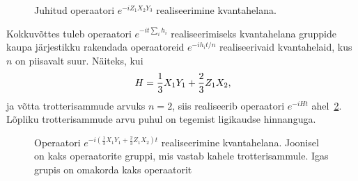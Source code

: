 \documentclass[12pt]{report}
\def\paren#1{\left(#1\right)}
\begin{document}
\begin{figure}[h]
  \centering
  \ifdefined\yquanton
  \fi
  \caption{Juhitud operaatori \(e^{-iZ_1X_2Y_3}\) realiseerimine kvantahelana.}
  \label{f:xyzex}
\end{figure}

Kokkuvõttes tuleb operaatori \(e^{-i t \sum_i h_i}\) realiseerimiseks kvantahelana gruppide kaupa järjestikku rakendada operaatoreid \(e^{-i h_i t/n}\) realiseerivaid kvantahelaid, kus \(n\) on piisavalt suur.
Näiteks, kui
\begin{align}\label{eq:hex}
    H=\frac{1}{3}X_1Y_1+\frac{2}{3}Z_1X_2 \rlap{,}
\end{align}
ja võtta trotterisammude arvuks \(n = 2\), siis realiseerib operaatori \(e^{-i Ht}\) ahel~\ref{fig:trot}.
Lõpliku trotterisammude arvu puhul on tegemist ligikaudse hinnanguga.

\begin{figure}
    \centering
    \ifdefined\yquanton
    \fi
    \caption{Operaatori \(e^{-i\paren{\frac{1}{3}X_1Y_1+\frac{2}{3}Z_1X_2} t}\) realiseerimine kvantahelana.
    Joonisel on kaks operaatorite gruppi, mis vastab kahele trotterisammule.
    Igas grupis on omakorda kaks operaatorit}
    \label{fig:trot}
\end{figure}
\end{document}

